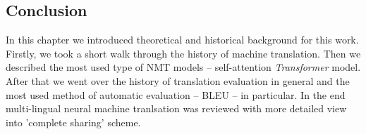 \subsection{Conclusion}

In this chapter we introduced theoretical and historical background for this work.
Firstly, we took a short walk through the history of machine translation.
Then we described the most used type of NMT models -- self-attention \textit{Transformer} model.
After that we went over the history of translation evaluation in general and the most
used method of automatic evaluation -- BLEU -- in particular.
In the end multi-lingual neural machine tranlsation was reviewed with more detailed view into
'complete sharing' scheme.

